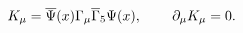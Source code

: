 \begin{equation}
 K_\mu = \overline{\Psi }(x)\Gamma _\mu
\overline{\Gamma }_5\Psi (x) ,\hspace{0.3in}\partial_\mu K_\mu =0
. \label{55}
\end{equation}

